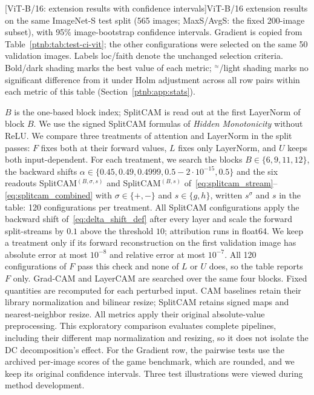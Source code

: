 \begin{center}
    \captionsetup{hypcap=false}
    [ViT-B/16: extension results with confidence intervals]{ViT-B/16 extension results on the same ImageNet-S test split (565 images; MaxS/AvgS: the fixed 200-image subset), with 95\% image-bootstrap confidence intervals. Gradient is copied from Table~\ref{ptnb:tab:test-ci-vit}; the other configurations were selected on the same 50 validation images. Labels loc/faith denote the unchanged selection criteria. Bold/dark shading marks the best value of each metric; $^{\approx}$/light shading marks no significant difference from it under Holm adjustment across all row pairs within each metric of this table (Section~\ref{ptnb:app:stats}).}
    \label{tab:vit-extension}
\end{center}
\captionsetup{hypcap=true}
\noindent $B$ is the one-based block index; SplitCAM is read out at the first LayerNorm of block $B$. We use the signed SplitCAM formulas of \emph{Hidden Monotonicity} without ReLU. We compare three treatments of attention and LayerNorm in the split passes: $F$ fixes both at their forward values, $L$ fixes only LayerNorm, and $U$ keeps both input-dependent. For each treatment, we search the blocks $B\in\{6,9,11,12\}$, the backward shifts $\alpha\in\{0.45,0.49,0.4999,0.5-2\cdot10^{-15},0.5\}$ and the six readouts SplitCAM$^{(B,\sigma,s)}$ and SplitCAM$^{(B,s)}$ of~\eqref{eq:splitcam_stream}--\eqref{eq:splitcam_combined} with $\sigma\in\{+,-\}$ and $s\in\{g,h\}$, written $s^{\sigma}$ and $s$ in the table: 120 configurations per treatment. All SplitCAM configurations apply the backward shift of~\eqref{eq:delta_shift_def} after every layer and scale the forward split-streams by $0.1$ above the threshold $10$; attribution runs in float64. We keep a treatment only if its forward reconstruction on the first validation image has absolute error at most $10^{-8}$ and relative error at most $10^{-7}$. All 120 configurations of $F$ pass this check and none of $L$ or $U$ does, so the table reports $F$ only. Grad-CAM and LayerCAM are searched over the same four blocks. Fixed quantities are recomputed for each perturbed input. CAM baselines retain their library normalization and bilinear resize; SplitCAM retains signed maps and nearest-neighbor resize. All metrics apply their original absolute-value preprocessing. This exploratory comparison evaluates complete pipelines, including their different map normalization and resizing, so it does not isolate the DC decomposition's effect. For the Gradient row, the pairwise tests use the archived per-image scores of the game benchmark, which are rounded, and we keep its original confidence intervals. Three test illustrations were viewed during method development.

